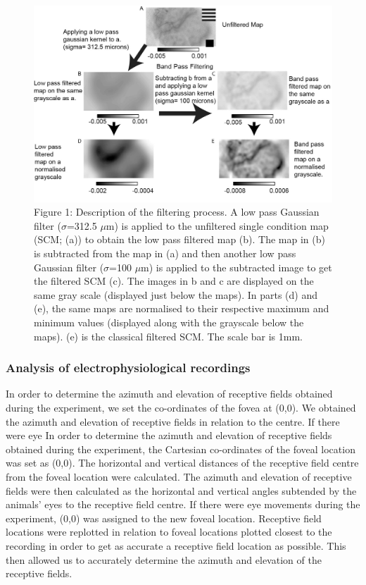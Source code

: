 			\begin{figure}
			
				\includegraphics[width=\linewidth]{rb/filtering.jpg}
				\caption{Figure 1: Description of the filtering process. A low pass Gaussian filter ($\sigma$=312.5 $\mu$m) is applied to the unfiltered single condition map (SCM; (a)) to obtain the low pass filtered map (b). The map in (b) is subtracted from the map in (a) and then another low pass Gaussian filter ($\sigma$=100 $\mu$m) is applied to the subtracted image to get the filtered SCM (c). The images in b and c are displayed on the same gray scale (displayed just below the maps). In parts (d) and (e), the same maps are normalised to their respective maximum and minimum values (displayed along with the grayscale below the maps). (e) is the classical filtered SCM. The scale bar is 1mm.}
				\label{fig:fig1}
			\end{figure}
			
		\subsubsection{Analysis of electrophysiological recordings}
			
			In order to determine the azimuth and elevation of receptive fields obtained during the experiment, we set the co-ordinates of the fovea at (0,0). We obtained the azimuth and elevation of receptive fields in relation to the centre. If there were eye In order to determine the azimuth and elevation of receptive fields obtained during the experiment, the Cartesian co-ordinates of the foveal location was set as (0,0). The horizontal and vertical distances of the receptive field centre from the foveal location were calculated. The azimuth and elevation of receptive fields were then calculated as the horizontal and vertical angles subtended by the animals’ eyes to the receptive field centre. If there were eye movements during the experiment, (0,0) was assigned to the new foveal location. Receptive field locations were replotted in relation to foveal locations plotted closest to the recording in order to get as accurate a receptive field location as possible. This then allowed us to accurately determine the azimuth and elevation of the receptive fields.
			
